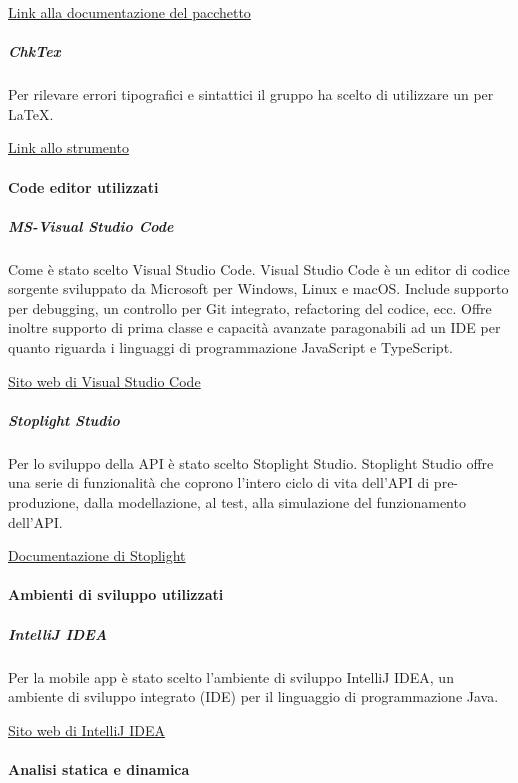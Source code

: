\documentclass[../../norme-di-progetto.tex]{subfiles}
\begin{document}
\href{http://texdoc.net/texmf-dist/doc/latex/pgfgantt/pgfgantt.pdf}{Link alla documentazione del pacchetto}

\subparagraph{ChkTex}%
\label{subp:chktex}
Per rilevare errori tipografici e sintattici il gruppo ha scelto di utilizzare  un  per \LaTeX{}.

\href{https://www.nongnu.org/chktex/}{Link allo strumento}


\paragraph{Code editor utilizzati}%
\label{par:code_editor}

\subparagraph{MS-Visual Studio Code}%
\label{subp:vscode}
Come  è stato scelto Visual Studio Code.
Visual Studio Code è un editor di codice sorgente sviluppato da Microsoft per Windows, Linux e macOS\@. Include supporto per debugging, un controllo per Git integrato, refactoring del codice, ecc. Offre inoltre supporto di prima classe e capacità avanzate paragonabili ad un IDE per quanto riguarda i linguaggi di programmazione JavaScript e TypeScript.

\href{https://code.visualstudio.com/}{Sito web di Visual Studio Code}

\subparagraph{Stoplight Studio}%
\label{subp:stoplight_studio}
Per lo sviluppo della API è stato scelto Stoplight Studio.
Stoplight Studio offre una serie di funzionalità che coprono l'intero ciclo di vita dell'API di pre-produzione, dalla modellazione, al test, alla simulazione del funzionamento dell'API\@.

\href{https://stoplight.io/docs}{Documentazione di Stoplight}

\paragraph{Ambienti di sviluppo utilizzati}%
\label{par:ambienti_di_sviluppo}

\subparagraph{IntelliJ IDEA}%
\label{subp:intellij}
Per la mobile app è stato scelto l'ambiente di sviluppo IntelliJ IDEA, un ambiente di sviluppo integrato (IDE) per il linguaggio di programmazione Java.

\href{https://www.jetbrains.com/idea/}{Sito web di IntelliJ IDEA}

\paragraph{Analisi statica e dinamica}%
\label{par:analisi_statica_e_dinamica}
\end{document}
